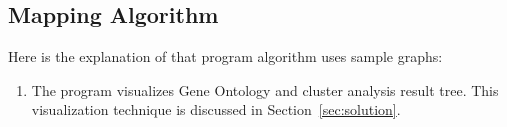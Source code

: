 \subsection{Mapping Algorithm}
\label{sec:mapping_algorithm}
Here is the explanation of that program algorithm uses sample graphs:
\begin{enumerate}

\item The program visualizes Gene Ontology and cluster analysis result tree. This visualization technique is discussed in Section~\ref{sec:solution}.

\begin{figure}[h!]
\centering
{}
\end{figure}
\end{enumerate}

